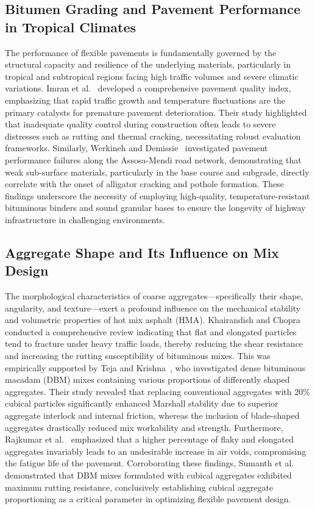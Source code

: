 \documentclass[12pt,a4paper]{article}
\begin{document}
\subsection{Bitumen Grading and Pavement Performance in Tropical Climates}
The performance of flexible pavements is fundamentally governed by the structural capacity and resilience of the underlying materials, particularly in tropical and subtropical regions facing high traffic volumes and severe climatic variations. Imran et al.~\cite{imran2025developing} developed a comprehensive pavement quality index, emphasizing that rapid traffic growth and temperature fluctuations are the primary catalysts for premature pavement deterioration. Their study highlighted that inadequate quality control during construction often leads to severe distresses such as rutting and thermal cracking, necessitating robust evaluation frameworks. Similarly, Werkineh and Demissie~\cite{werkineh2020assessment} investigated pavement performance failures along the Assosa-Mendi road network, demonstrating that weak sub-surface materials, particularly in the base course and subgrade, directly correlate with the onset of alligator cracking and pothole formation. These findings underscore the necessity of employing high-quality, temperature-resistant bituminous binders and sound granular bases to ensure the longevity of highway infrastructure in challenging environments.

\subsection{Aggregate Shape and Its Influence on Mix Design}
The morphological characteristics of coarse aggregates---specifically their shape, angularity, and texture---exert a profound influence on the mechanical stability and volumetric properties of hot mix asphalt (HMA). Khairandish and Chopra~\cite{khairandish2020influence} conducted a comprehensive review indicating that flat and elongated particles tend to fracture under heavy traffic loads, thereby reducing the shear resistance and increasing the rutting susceptibility of bituminous mixes. This was empirically supported by Teja and Krishna~\cite{teja2020effect}, who investigated dense bituminous macadam (DBM) mixes containing various proportions of differently shaped aggregates. Their study revealed that replacing conventional aggregates with 20\% cubical particles significantly enhanced Marshall stability due to superior aggregate interlock and internal friction, whereas the inclusion of blade-shaped aggregates drastically reduced mix workability and strength. Furthermore, Rajkumar et al.~\cite{rajkumar2018experimental} emphasized that a higher percentage of flaky and elongated aggregates invariably leads to an undesirable increase in air voids, compromising the fatigue life of the pavement. Corroborating these findings, Sumanth et al.~\cite{sumanth2017study} demonstrated that DBM mixes formulated with cubical aggregates exhibited maximum rutting resistance, conclusively establishing cubical aggregate proportioning as a critical parameter in optimizing flexible pavement design.
\end{document}

